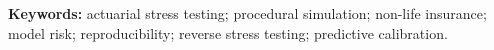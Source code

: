 \documentclass[12pt, letterpaper]{article}
\numberwithin{equation}{section}
\theoremstyle{plain}
\theoremstyle{definition}
\theoremstyle{remark}
\begin{document}
\vspace{1em}
\noindent\textbf{Keywords:} actuarial stress testing; procedural simulation; non-life insurance; model risk; reproducibility; reverse stress testing; predictive calibration.
\newpage
\setcounter{tocdepth}{2}
\tableofcontents
\newpage
\twocolumn




\onecolumn
\newpage
\nocite{*}


\end{document}
